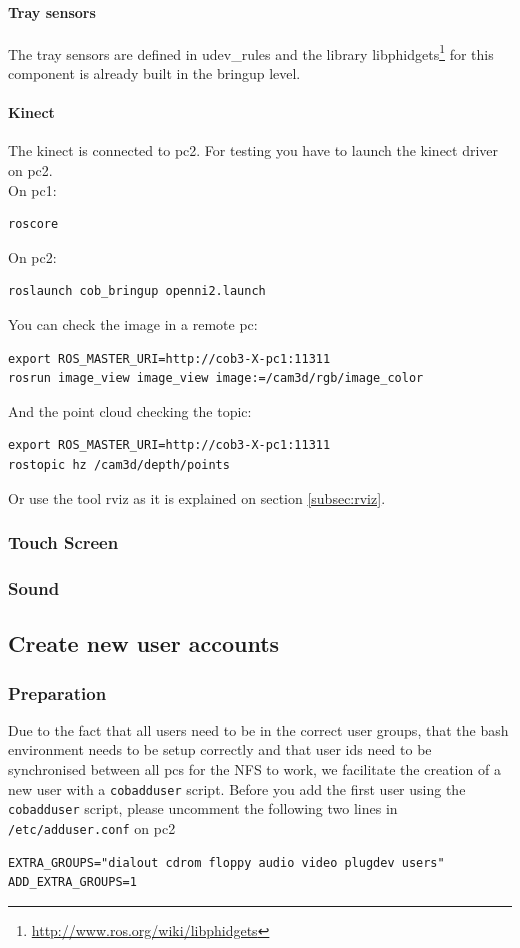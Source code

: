 \paragraph{Tray sensors}
The tray sensors are defined in udev\_rules and the library libphidgets\footnote{\url{http://www.ros.org/wiki/libphidgets}} for this component is already built in the bringup level.

\paragraph{Kinect}
The kinect is connected to pc2. 
For testing you have to launch the kinect driver on pc2.
\\On pc1:
\begin{lstlisting}
roscore
\end{lstlisting}
On pc2:
\begin{lstlisting}
roslaunch cob_bringup openni2.launch
\end{lstlisting}

You can check the image in a remote pc:
\begin{lstlisting}
export ROS_MASTER_URI=http://cob3-X-pc1:11311
rosrun image_view image_view image:=/cam3d/rgb/image_color
\end{lstlisting}

And the point cloud checking the topic:
\begin{lstlisting}
export ROS_MASTER_URI=http://cob3-X-pc1:11311
rostopic hz /cam3d/depth/points
\end{lstlisting}

Or use the tool rviz as it is explained on section \ref{subsec:rviz}.

\subsubsection{Touch Screen} 

\subsubsection{Sound}
 
\subsection{Create new user accounts}
\subsubsection{Preparation}
\label{sec:account}
Due to the fact that all users need to be in the correct user groups, that the bash environment needs to be setup correctly and that user ids need to be synchronised between all pcs for the NFS to work, we facilitate the creation of a new user with a \texttt{cobadduser} script. Before you add the first user using the \texttt{cobadduser} script, please uncomment the following two lines in \texttt{/etc/adduser.conf} on pc2
\begin{lstlisting}
EXTRA_GROUPS="dialout cdrom floppy audio video plugdev users"
ADD_EXTRA_GROUPS=1
\end{lstlisting}

